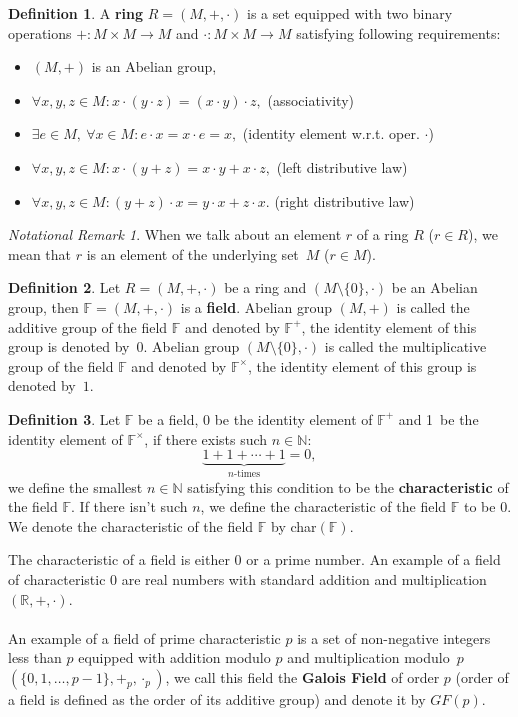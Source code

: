 \documentclass[thesis=M,english]{FITthesis}[2012/10/20]
\theoremstyle{remark}
\newtheorem*{NRM}{Notational Remark}
\theoremstyle{definition}
\newtheorem{DF}{Definition}[section]
\begin{document}
\begin{DF}
A \textbf{ring} $R = (M, +, \cdot)$  is a set equipped with two binary operations $+: M\times M \to M$ and $\cdot:  M\times M \to M$ satisfying following requirements:
\begin{itemize}
\item $(M, +)$ is an Abelian group, 
\item $\forall x,y,z \in M: x\cdot(y\cdot z) = (x \cdot y) \cdot z, $ \hfill (associativity)
\item $\exists e \in M,\ \forall x \in M: e \cdot x = x \cdot e = x,$ \hfill (identity element w.r.t. oper. $\cdot$)
\item $\forall x,y,z \in M:x \cdot(y+z)= x\cdot y + x \cdot z,$ \hfill (left distributive law) 
\item $\forall x,y, z \in M:(y + z) \cdot x = y\cdot x + z \cdot x.$ \hfill(right distributive law)
\end{itemize}
\end{DF}
\begin{NRM}
When we talk about an element $r$ of a ring $R$ ($r \in R$), we mean that $r$ is an element of the underlying set~$M$ ($r \in M$).
\end{NRM}
\begin{DF}
Let $R = (M,+,\cdot)$ be a ring and $(M \setminus \{0\}, \cdot)$ be an Abelian group, then $\mathbb{F} = (M, +, \cdot)$ is a \textbf{field}. Abelian group $(M, +)$ is  called the additive group of the field $\mathbb{F}$ and denoted by $\mathbb{F}^+$, the identity element of this group is denoted by~$0$. Abelian group $(M \setminus \{0\}, \cdot)$ is called the multiplicative group of the field $\mathbb{F}$ and denoted by $\mathbb{F}^\times$, the identity element of this group is denoted by~$1$.
\end{DF}
\begin{DF}
Let $\mathbb{F}$ be a field, 0 be the identity element of $\mathbb{F}^+$ and 1~be the identity element of $\mathbb{F}^\times$, if there exists such $n \in \mathbb{N}:$
$$
 \underbrace{1 + 1 + \cdots + 1}_\text{$n$-times} = 0,
$$ we define the smallest $n \in \mathbb{N}$ satisfying this condition to be the \textbf{characteristic} of the field $\mathbb{F}.$ If there isn't such $n$, we define the characteristic of the field $\mathbb{F}$ to be $0$. We denote the characteristic of the field $\mathbb{F}$ by char$(\mathbb{F})$.
\end{DF}
\noindent The characteristic of a field is either $0$ or a prime number. An example of a field of characteristic $0$ are real numbers with standard addition and multiplication $(\mathbb{R}, +, \cdot)$. \\ \\
An example of a field of prime characteristic $p$ is a set of non-negative integers less than $p$ equipped with addition modulo $p$ and multiplication modulo~$p$ $(\{0, 1, \ldots, p-1\}, +_p, \cdot_p)$, we call this field the \textbf{Galois Field} of order $p$ (order of a field is defined as the order of its additive group) and denote it by $GF(p)$.
\end{document}

